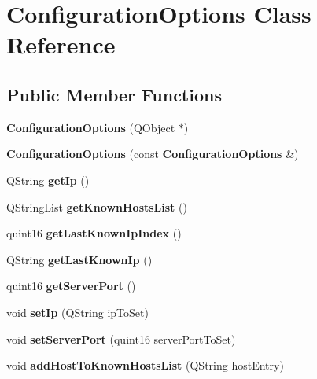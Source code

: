 \section{ConfigurationOptions Class Reference}
\label{class_configuration_options}
\subsection*{Public Member Functions}
\begin{DoxyCompactItemize}
\item 
{\bfseries ConfigurationOptions} (QObject $\ast$)\label{class_configuration_options_a680dac4365cd1f2aa5dbc800028bfa47}

\item 
{\bfseries ConfigurationOptions} (const {\bf ConfigurationOptions} \&)\label{class_configuration_options_a6b493d24d9402069c24db13df801ed14}

\item 
QString {\bfseries getIp} ()\label{class_configuration_options_a89963fb150da246532d0bdfbef207408}

\item 
QStringList {\bfseries getKnownHostsList} ()\label{class_configuration_options_a36319761ca5639f4c3c45ea5949842c0}

\item 
quint16 {\bfseries getLastKnownIpIndex} ()\label{class_configuration_options_a2aa15a85d8dfa0b3641c4a214c64997d}

\item 
QString {\bfseries getLastKnownIp} ()\label{class_configuration_options_ad33f2bbc68b25def00317c43d1ede26d}

\item 
quint16 {\bfseries getServerPort} ()\label{class_configuration_options_a438e2c552c162fd8a4519aa3e4b1b0f4}

\item 
void {\bfseries setIp} (QString ipToSet)\label{class_configuration_options_aa6fb6a8abebe10abc83d56c8e238f8ec}

\item 
void {\bfseries setServerPort} (quint16 serverPortToSet)\label{class_configuration_options_a3db64a191544db35136970a41a8ba06a}

\item 
void {\bfseries addHostToKnownHostsList} (QString hostEntry)\label{class_configuration_options_ae1ff02f7ba10a58a05a16c68bceacc97}


\end{DoxyCompactItemize}
